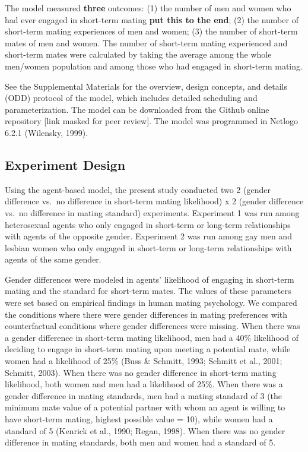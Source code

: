 \documentclass[
  11pt,
]{article}
\begin{document}
The model measured \textbf{three} outcomes: (1) the number of men and
women who had ever engaged in short-term mating \textbf{put this to the
end}; (2) the number of short-term mating experiences of men and women;
(3) the number of short-term mates of men and women. The number of
short-term mating experienced and short-term mates were calculated by
taking the average among the whole men/women population and among those
who had engaged in short-term mating.

See the Supplemental Materials for the overview, design concepts, and
details (ODD) protocol of the model, which includes detailed scheduling
and parameterization. The model can be downloaded from the Github online
repository {[}link masked for peer review{]}. The model was programmed
in Netlogo 6.2.1 (Wilensky, 1999).

\hypertarget{experiment-design}{%
\subsection{Experiment Design}\label{experiment-design}}

Using the agent-based model, the present study conducted two 2 (gender
difference vs.~no difference in short-term mating likelihood) x 2
(gender difference vs.~no difference in mating standard) experiments.
Experiment 1 was run among heterosexual agents who only engaged in
short-term or long-term relationships with agents of the opposite
gender. Experiment 2 was run among gay men and lesbian women who only
engaged in short-term or long-term relationships with agents of the same
gender.

Gender differences were modeled in agents' likelihood of engaging in
short-term mating and the standard for short-term mates. The values of
these parameters were set based on empirical findings in human mating
psychology. We compared the conditions where there were gender
differences in mating preferences with counterfactual conditions where
gender differences were missing. When there was a gender difference in
short-term mating likelihood, men had a 40\% likelihood of deciding to
engage in short-term mating upon meeting a potential mate, while women
had a likelihood of 25\% (Buss \& Schmitt, 1993; Schmitt et al., 2001;
Schmitt, 2003). When there was no gender difference in short-term mating
likelihood, both women and men had a likelihood of 25\%. When there was
a gender difference in mating standards, men had a mating standard of 3
(the minimum mate value of a potential partner with whom an agent is
willing to have short-term mating, highest possible value = 10), while
women had a standard of 5 (Kenrick et al., 1990; Regan, 1998). When
there was no gender difference in mating standards, both men and women
had a standard of 5.
\end{document}
